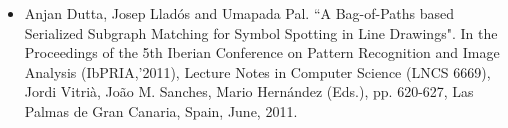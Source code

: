 \begin{itemize}
\item Anjan Dutta, Josep Lladós and Umapada Pal. ``A Bag-of-Paths based Serialized Subgraph Matching for Symbol Spotting in Line Drawings". In the Proceedings of the 5th Iberian Conference on Pattern Recognition and Image Analysis (IbPRIA,'2011), Lecture Notes in Computer Science (LNCS 6669), Jordi Vitrià, João M. Sanches, Mario Hernández (Eds.), pp. 620-627, Las Palmas de Gran Canaria, Spain, June, 2011.
\vspace*{.3cm}

\end{itemize}